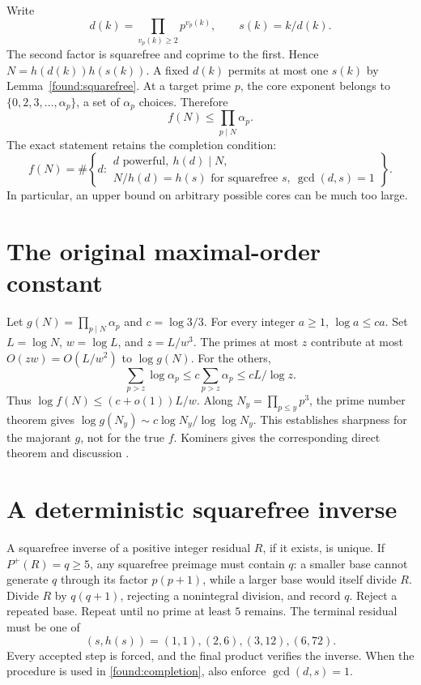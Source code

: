 Write
\[
 d(k)=\prod_{v_p(k)\ge2}p^{v_p(k)},\qquad s(k)=k/d(k).
\]
The second factor is squarefree and coprime to the first. Hence
$N=h(d(k))h(s(k))$. A fixed $d(k)$ permits at most one $s(k)$ by
Lemma~\ref{found:squarefree}. At a target prime $p$, the core exponent belongs
to $\{0,2,3,\ldots,\alpha_p\}$, a set of $\alpha_p$ choices. Therefore
\begin{equation}\label{found:product}
 \boxed{f(N)\le\prod_{p\mid N}\alpha_p.}
\end{equation}
The exact statement retains the completion condition:
\begin{equation}\label{found:completion}
 f(N)=\#\left\{d:\begin{array}{l}
 d\text{ powerful},\ h(d)\mid N,\\
 N/h(d)=h(s)\text{ for squarefree }s,\ \gcd(d,s)=1
 \end{array}\right\}.
\end{equation}
In particular, an upper bound on arbitrary possible cores can be much too large.

\section{The original maximal-order constant}
Let $g(N)=\prod_{p\mid N}\alpha_p$ and $c=\log3/3$. For every integer $a\ge1$,
$\log a\le ca$. Set $L=\log N$, $w=\log L$, and $z=L/w^3$. The primes at most
$z$ contribute at most $O(z w)=O(L/w^2)$ to $\log g(N)$. For the others,
\[
 \sum_{p>z}\log\alpha_p\le c\sum_{p>z}\alpha_p\le cL/\log z.
\]
Thus $\log f(N)\le(c+o(1))L/w$. Along
$N_y=\prod_{p\le y}p^3$, the prime number theorem gives
$\log g(N_y)\sim c\log N_y/\log\log N_y$.
This establishes sharpness for the majorant $g$, not for the true $f$.
Kominers gives the corresponding direct theorem and discussion \cite{kominers}.

\section{A deterministic squarefree inverse}
A squarefree inverse of a positive integer residual $R$, if it exists, is unique.
If $P^+(R)=q\ge5$, any squarefree preimage must contain $q$: a smaller base
cannot generate $q$ through its factor $p(p+1)$, while a larger base would
itself divide $R$. Divide $R$ by $q(q+1)$, rejecting a nonintegral division,
and record $q$. Reject a repeated base. Repeat until no prime at least $5$
remains. The terminal residual must be one of
\[
 (s,h(s))=(1,1),(2,6),(3,12),(6,72).
\]
Every accepted step is forced, and the final product verifies the inverse.
When the procedure is used in \eqref{found:completion}, also enforce
$\gcd(d,s)=1$.


